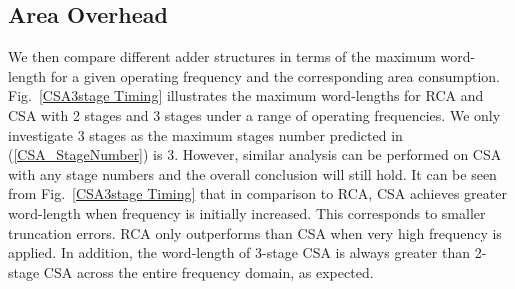 \documentclass[journal]{IEEEtran}
\begin{document}
\subsection{Area Overhead}
We then compare different adder structures in terms of the maximum word-length for a given operating frequency and the corresponding area consumption. Fig.~\ref{CSA3stage Timing} illustrates the maximum word-lengths for RCA and CSA with 2 stages and 3 stages under a range of operating frequencies. We only investigate 3 stages as the maximum stages number predicted in (\ref{CSA_StageNumber}) is 3. However, similar analysis can be performed on CSA with any stage numbers and the overall conclusion will still hold. It can be seen from Fig.~\ref{CSA3stage Timing} that in comparison to RCA, CSA achieves greater word-length when frequency is initially increased. This corresponds to smaller truncation errors. RCA only outperforms than CSA when very high frequency is applied. In addition, the word-length of 3-stage CSA is always greater than 2-stage CSA across the entire frequency domain, as expected.
\end{document}
